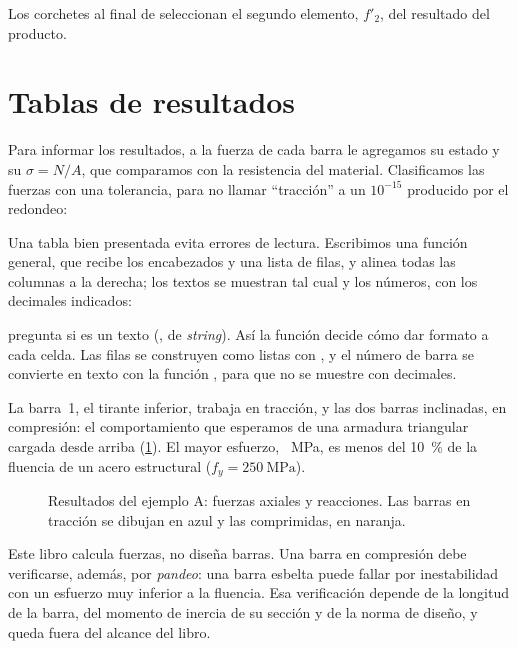 Los corchetes al final de  seleccionan el segundo
elemento, $f'_2$, del resultado del producto.

\section{Tablas de resultados}\label{sec:tablas}

Para informar los resultados, a la fuerza de cada barra le agregamos su
estado y su  $\sigma = N/A$, que comparamos con la
resistencia del material. Clasificamos las fuerzas con una tolerancia, para
no llamar \enquote{tracción} a un $10^{-15}$ producido por el redondeo:

Una tabla bien presentada evita errores de lectura. Escribimos una función
general, que recibe los encabezados y una lista de filas, y alinea todas las
columnas a la derecha; los textos se muestran tal cual y los números, con los
decimales indicados:

\begin{python}
 pregunta si  es un texto (, de
\emph{string}). Así la función decide cómo dar formato a cada celda. Las filas
se construyen como listas con , y el número de barra se convierte
en texto con la función , para que no se muestre con decimales.
\end{python}


La barra~1, el tirante inferior, trabaja en tracción, y las dos barras
inclinadas, en compresión: el comportamiento que esperamos de una armadura
triangular cargada desde arriba (\cref{fig:resultados_ejemplo_a}). El mayor
esfuerzo, ~\si{\mega\pascal}, es menos del
\SI{10}{\percent} de la fluencia de un acero estructural
($f_y = \SI{250}{\mega\pascal}$).

\begin{figure}[ht]
  \centering
  \caption{Resultados del ejemplo A: fuerzas axiales y reacciones. Las barras
    en tracción se dibujan en azul y las comprimidas, en naranja.}
  \label{fig:resultados_ejemplo_a}
\end{figure}

\begin{cuidado}
Este libro calcula fuerzas, no diseña barras. Una barra en compresión debe
verificarse, además, por \emph{pandeo}: una barra esbelta puede fallar por
inestabilidad con un esfuerzo muy inferior a la fluencia. Esa verificación
depende de la longitud de la barra, del momento de inercia de su sección y de
la norma de diseño, y queda fuera del alcance del libro.
\end{cuidado}

